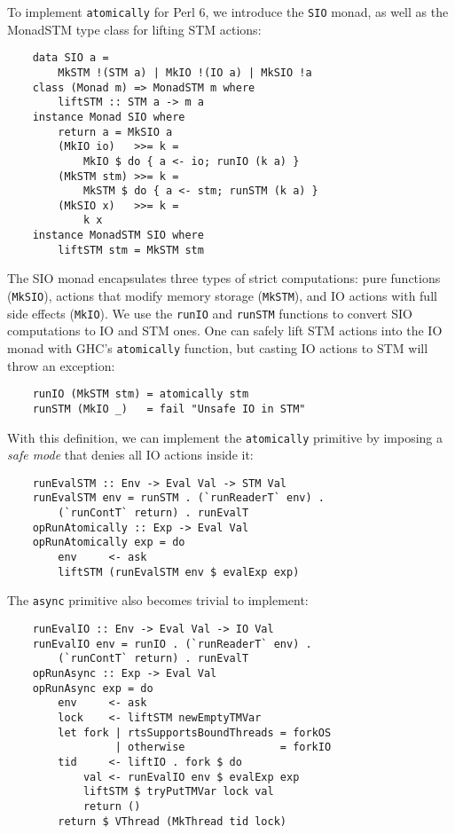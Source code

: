 \documentclass[]{sigplanconf}
\newcommand{\code}[1]{\texttt{#1}}
\begin{document}
To implement \code{atomically} for Perl 6, we introduce the \code{SIO} monad,
as well as the MonadSTM type class for lifting STM actions:

\begin{lstlisting}
    data SIO a =
        MkSTM !(STM a) | MkIO !(IO a) | MkSIO !a
    class (Monad m) => MonadSTM m where
        liftSTM :: STM a -> m a
    instance Monad SIO where
        return a = MkSIO a
        (MkIO io)   >>= k =
            MkIO $ do { a <- io; runIO (k a) }
        (MkSTM stm) >>= k =
            MkSTM $ do { a <- stm; runSTM (k a) }
        (MkSIO x)   >>= k =
            k x
    instance MonadSTM SIO where
        liftSTM stm = MkSTM stm
\end{lstlisting}

The SIO monad encapsulates three types of strict computations: pure functions
(\code{MkSIO}), actions that modify memory storage (\code{MkSTM}), and IO
actions with full side effects (\code{MkIO}).  We use the \code{runIO} and
\code{runSTM} functions to convert SIO computations to IO and STM ones.  One
can safely lift STM actions into the IO monad with GHC's \code{atomically}
function, but casting IO actions to STM will throw an exception:

\begin{lstlisting}
    runIO (MkSTM stm) = atomically stm
    runSTM (MkIO _)   = fail "Unsafe IO in STM"
\end{lstlisting}

With this definition, we can implement the \code{atomically} primitive by
imposing a \emph{safe mode} that denies all IO actions inside it:

\begin{lstlisting}
    runEvalSTM :: Env -> Eval Val -> STM Val
    runEvalSTM env = runSTM . (`runReaderT` env) .
        (`runContT` return) . runEvalT
    opRunAtomically :: Exp -> Eval Val
    opRunAtomically exp = do
        env     <- ask
        liftSTM (runEvalSTM env $ evalExp exp)
\end{lstlisting}

The \code{async} primitive also becomes trivial to implement:

\begin{lstlisting}
    runEvalIO :: Env -> Eval Val -> IO Val
    runEvalIO env = runIO . (`runReaderT` env) .
        (`runContT` return) . runEvalT
    opRunAsync :: Exp -> Eval Val
    opRunAsync exp = do
        env     <- ask
        lock    <- liftSTM newEmptyTMVar
        let fork | rtsSupportsBoundThreads = forkOS
                 | otherwise               = forkIO
        tid     <- liftIO . fork $ do
            val <- runEvalIO env $ evalExp exp
            liftSTM $ tryPutTMVar lock val
            return ()
        return $ VThread (MkThread tid lock)
\end{lstlisting}
\end{document}
